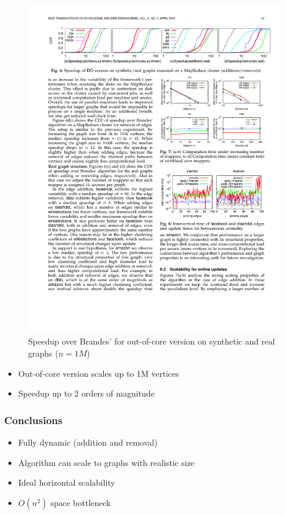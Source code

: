 \begin{frame}
\begin{figure}[t]
    \includegraphics[width=\textwidth, height=0.3\textheight, keepaspectratio]{imgs/kdb-results22}
    \caption{Speedup over Brandes' for out-of-core version on synthetic and real graphs ($n = 1M$)}
  \end{figure}

  \begin{itemize}
    \item Out-of-core version scales up to 1M vertices
    \item Speedup up to 2 orders of magnitude
  \end{itemize}

\end{frame}

\begin{frame}
  \frametitle{Conclusions}

  \begin{itemize}
    \item Fully dynamic (addition and removal)
    \item Algorithm can scale to graphs with realistic size
    \item Ideal horizontal scalability
    \item $O(n^2)$ space bottleneck
  \end{itemize}
\end{frame}
